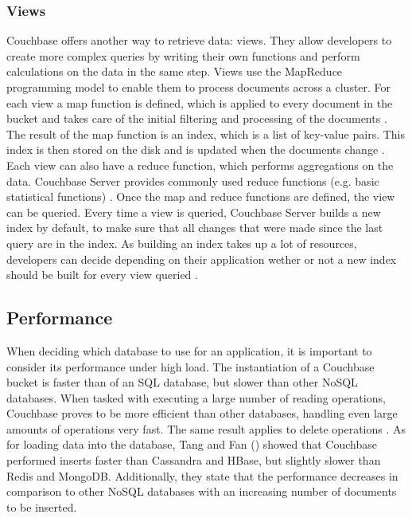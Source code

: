 \subsubsection{Views}
Couchbase offers another way to retrieve data: views. They allow developers to create more complex queries by writing their own functions and perform calculations on the data in the same step. Views use the MapReduce programming model to enable them to process documents across a cluster. For each view a map function is defined, which is applied to every document in the bucket and takes care of the initial filtering and processing of the documents \parencite{proCouchbaseServer}. The result of the map function is an index, which is a list of key-value pairs. This index is then stored on the disk and is updated when the documents change \parencite{couchbaseDocViews}. Each view can also have a reduce function, which performs aggregations on the data. Couchbase Server provides commonly used reduce functions (e.g. basic statistical functions) \parencite{proCouchbaseServer}. Once the map and reduce functions are defined, the view can be queried. Every time a view is queried, Couchbase Server builds a new index by default, to make sure that all changes that were made since the last query are in the index. As building an index takes up a lot of resources, developers can decide depending on their application wether or not a new index should be built for every view queried \parencite{couchbaseDocViews}.


\subsection{Performance}
When deciding which database to use for an application, it is important to consider its performance under high load. The instantiation of a Couchbase bucket is faster than of an SQL database, but slower than other NoSQL databases. When tasked with executing a large number of reading operations, Couchbase proves to be more efficient than other databases, handling even large amounts of operations very fast. The same result applies to delete operations \parencite{compNoSQLandSQL}.  As for loading data into the database, Tang and Fan (\parencite{insert}) showed that Couchbase performed inserts faster than Cassandra and HBase, but slightly slower than Redis and MongoDB. Additionally, they state that the performance decreases in comparison to other NoSQL databases with an increasing number of documents to be inserted.


